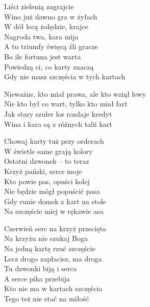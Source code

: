 \begin{text}
    Liści zielenią zagrajcie\\
    Wino już dawno gra w żyłach\\
    W dół lecą żołędzie, krajce\\
    Nagroda twa, kara mija\\
    \vin A tu triumfy święcą źli gracze\\
    \vin Bo ile fortuna jest warta\\
    \vin Powiedzą ci, co karty znaczą\\
    \vin Gdy nie masz szczęścia w tych kartach

    Nieważne, kto miał prawa, ale kto wziął lewy\\
    Nie kto był co wart, tylko kto miał fart\\
    Jak stary szuler los rozdaje kredyt\\
    Wina i kara są z różnych talii kart

    Chowaj karty tuż przy orderach\\
    W świetle same grają kolory\\
    Ostatni dzwonek – to teraz\\
    Krzyż pański, serce moje\\
    \vin Kto powie pas, opuści kolej\\
    \vin Nie będzie mógł popuścić pasa\\
    \vin Gdy runie domek z kart na stole\\
    \vin Na szczęście miej w rękawie asa

    Czerwień serc na krzyż przecięta\\
    Na krzyżu nie szukaj Boga\\
    Na jedną kartę rzuć szczęście\\
    Lecz drogo zapłacisz, ma droga\\
    \vin Tu dzwonki biją i serca\\
    \vin A serce pika przebija\\
    \vin Kto nie ma w kartach szczęścia\\
    \vin Tego też nie stać na miłość
\end{text}
\begin{chord}

\end{chord}